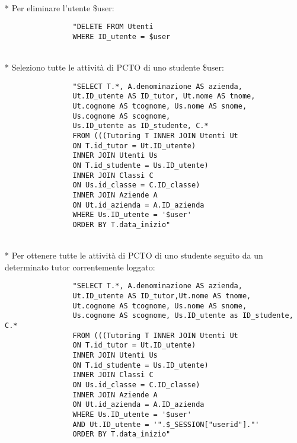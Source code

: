\documentclass[12pt]{article}
\begin{document}
\\*
\noindent
Per eliminare l'utente \$user:
\begin{verbatim}
                "DELETE FROM Utenti
                WHERE ID_utente = $user
\end{verbatim}

\\*
\noindent
Seleziono tutte le attività di PCTO di uno studente \$user:
\begin{verbatim}
                "SELECT T.*, A.denominazione AS azienda, 
                Ut.ID_utente AS ID_tutor, Ut.nome AS tnome, 
                Ut.cognome AS tcognome, Us.nome AS snome, 
                Us.cognome AS scognome, 
                Us.ID_utente as ID_studente, C.*
                FROM (((Tutoring T INNER JOIN Utenti Ut 
                ON T.id_tutor = Ut.ID_utente)
                INNER JOIN Utenti Us 
                ON T.id_studente = Us.ID_utente)
                INNER JOIN Classi C
                ON Us.id_classe = C.ID_classe)
                INNER JOIN Aziende A
                ON Ut.id_azienda = A.ID_azienda
                WHERE Us.ID_utente = '$user'
                ORDER BY T.data_inizio"
\end{verbatim}

\\*
\newpage
\noindent
Per ottenere tutte le attività di PCTO di uno studente seguito da un determinato tutor correntemente loggato:
\begin{verbatim}
                "SELECT T.*, A.denominazione AS azienda, 
                Ut.ID_utente AS ID_tutor,Ut.nome AS tnome, 
                Ut.cognome AS tcognome, Us.nome AS snome, 
                Us.cognome AS scognome, Us.ID_utente as ID_studente, C.*
                FROM (((Tutoring T INNER JOIN Utenti Ut 
                ON T.id_tutor = Ut.ID_utente)
                INNER JOIN Utenti Us 
                ON T.id_studente = Us.ID_utente)
                INNER JOIN Classi C
                ON Us.id_classe = C.ID_classe)
                INNER JOIN Aziende A
                ON Ut.id_azienda = A.ID_azienda
                WHERE Us.ID_utente = '$user'
                AND Ut.ID_utente = '".$_SESSION["userid"]."'
                ORDER BY T.data_inizio"
\end{verbatim}
\end{document}
